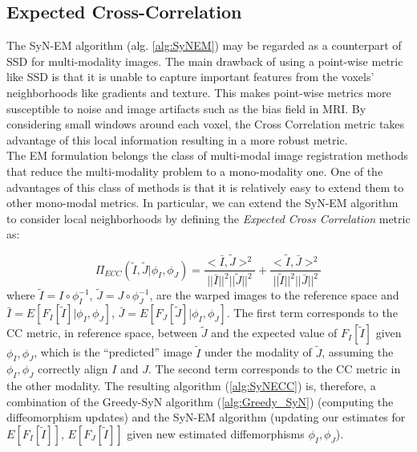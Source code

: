 \subsection{Expected Cross-Correlation}
The SyN-EM algorithm (alg. \ref{alg:SyNEM}) may be regarded as a counterpart of SSD for multi-modality images. The main drawback of using a point-wise metric like SSD is that
it is unable to capture important features from the voxels' neighborhoods like gradients and texture. This makes point-wise metrics more susceptible to noise and image artifacts
such as the bias field in MRI. By considering small windows around each voxel, the Cross Correlation metric takes advantage of this local information resulting in a more robust
metric.\\

The EM formulation belongs the class of multi-modal image registration methods that reduce the multi-modality problem to a mono-modality one\cite{Sotiras2013}. One of the
advantages of this class of methods is that it is relatively easy to extend them to other mono-modal metrics. In particular, we can extend the SyN-EM algorithm to consider
local neighborhoods by defining the {\it Expected Cross Correlation} metric as:

\begin{equation}\label{eq:ecc_metric}
    \Pi_{ECC}(\tilde{I}, \tilde{J} | \phi_{I}, \phi_{J}) = \frac{<\bar{I}, \tilde{J}>^{2}}{||\bar{I}||^{2}||\tilde{J}||^{2}} + \frac{<\tilde{I}, \bar{J}>^{2}}{||\tilde{I}||^{2}||\bar{J}||^{2}}
\end{equation}
where $\tilde{I} = I\circ \phi_{I}^{-1}$, $\tilde{J} = J\circ \phi_{J}^{-1}$, are the warped images to the reference space and
$\bar{I} = E[F_{I}[\tilde{I}]|\phi_{I}, \phi_{J}]$, $\bar{J} = E[F_{J}[\tilde{J}]|\phi_{I}, \phi_{J}]$. The first term corresponds to the CC metric, in reference space,
between $\tilde{J}$ and the expected value of $F_{I}[\tilde{I}]$ given $\phi_{I}, \phi_{J}$, which is the ``predicted'' image $\tilde{I}$ under the modality of $\tilde{J}$,
assuming the $\phi_{I}, \phi_{J}$ correctly align $I$ and $J$. The second term corresponds to the CC metric in the other modality. The resulting algorithm (\ref{alg:SyNECC})
is, therefore, a combination of the Greedy-SyN algorithm (\ref{alg:Greedy_SyN}) (computing the diffeomorphism updates) and the SyN-EM algorithm (updating our estimates
for $E[F_{I}[\tilde{I}]]$, $E[F_{J}[\tilde{I}]]$ given new estimated diffemorphisms $\phi_{I}, \phi_{J}$).

